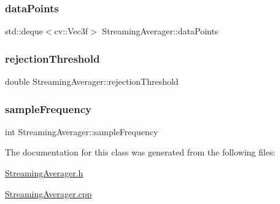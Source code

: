 \hypertarget{class_streaming_averager_aade55d0df31cc9652faf1fe4f7f2887c}{}\label{class_streaming_averager_aade55d0df31cc9652faf1fe4f7f2887c} 
\subsubsection{\texorpdfstring{data\+Points}{dataPoints}}
{\footnotesize\ttfamily std\+::deque$<$cv\+::\+Vec3f$>$ Streaming\+Averager\+::data\+Points\hspace{0.3cm}{\ttfamily [private]}}

\hypertarget{class_streaming_averager_a861d5b10b9cc18d8a94b070af1fd49e0}{}\label{class_streaming_averager_a861d5b10b9cc18d8a94b070af1fd49e0} 
\subsubsection{\texorpdfstring{rejection\+Threshold}{rejectionThreshold}}
{\footnotesize\ttfamily double Streaming\+Averager\+::rejection\+Threshold\hspace{0.3cm}{\ttfamily [private]}}

\hypertarget{class_streaming_averager_a4fa6f781e59a8b979da834e098fb262e}{}\label{class_streaming_averager_a4fa6f781e59a8b979da834e098fb262e} 
\subsubsection{\texorpdfstring{sample\+Frequency}{sampleFrequency}}
{\footnotesize\ttfamily int Streaming\+Averager\+::sample\+Frequency\hspace{0.3cm}{\ttfamily [private]}}



The documentation for this class was generated from the following files\+:\begin{DoxyCompactItemize}
\item 
\hyperlink{_streaming_averager_8h}{Streaming\+Averager.\+h}\item 
\hyperlink{_streaming_averager_8cpp}{Streaming\+Averager.\+cpp}\end{DoxyCompactItemize}

